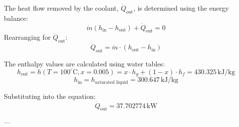 The heat flow removed by the coolant, \( \dot{Q}_{\text{out}} \), is determined using the energy balance:  
\[
\dot{m}(h_{\text{in}} - h_{\text{out}}) + \dot{Q}_{\text{out}} = 0
\]  
Rearranging for \( \dot{Q}_{\text{out}} \):  
\[
\dot{Q}_{\text{out}} = \dot{m} \cdot (h_{\text{out}} - h_{\text{in}})
\]  

The enthalpy values are calculated using water tables:  
\[
h_{\text{out}} = h(T = 100^\circ\text{C}, x = 0.005) = x \cdot h_g + (1 - x) \cdot h_f = 430.325 \, \text{kJ/kg}
\]  
\[
h_{\text{in}} = h_{\text{saturated liquid}} = 300.647 \, \text{kJ/kg}
\]  

Substituting into the equation:  
\[
\dot{Q}_{\text{out}} = 37.702774 \, \text{kW}
\]  

---